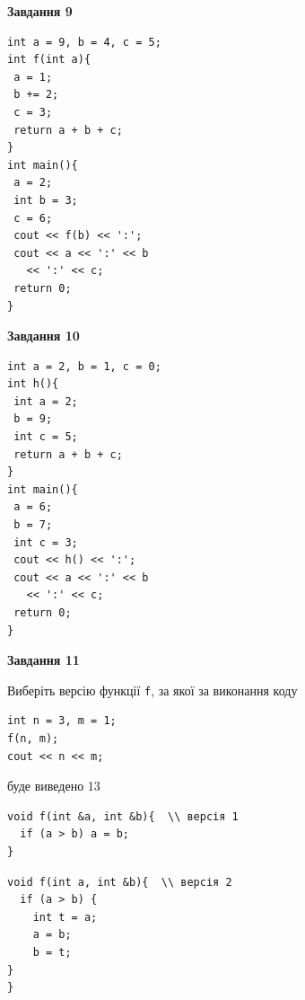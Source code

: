 \documentclass[12pt, ukrainian]{article}
\def\code#1{\Verb!#1!}
\begin{document}
{\begin {large}
\begin{minipage}[t]{11.0cm}
\end{minipage}


\begin{minipage}[t]{7.0cm}

\begin{center}
\textbf{Завдання 9}
\end{center}
\vspace{-8mm}

\begin{verbatim}
int a = 9, b = 4, c = 5;
int f(int a){
 a = 1;
 b += 2;
 c = 3;
 return a + b + c;
}
int main(){
 a = 2;
 int b = 3;
 c = 6;
 cout << f(b) << ':';
 cout << a << ':' << b 
   << ':' << c;
 return 0;
}
\end{verbatim}



\begin{center}
\textbf{Завдання 10}
\end{center}
\vspace{-8mm}

\begin{verbatim}
int a = 2, b = 1, c = 0;
int h(){
 int a = 2;
 b = 9;
 int c = 5;
 return a + b + c;
}
int main(){
 a = 6;
 b = 7;
 int c = 3;
 cout << h() << ':';
 cout << a << ':' << b 
   << ':' << c;
 return 0;
}
\end{verbatim}

\end{minipage}
\vline \hspace{1mm}
\begin{minipage}[t]{11.0cm}

\begin{center}
\textbf{Завдання 11}
\end{center}
Виберіть версію функції \code{f}, за якої за виконання коду
\begin{verbatim}
int n = 3, m = 1;
f(n, m);
cout << n << m;
\end{verbatim}

буде виведено 13

\begin{verbatim}
void f(int &a, int &b){  \\ версія 1
  if (a > b) a = b;
}
\end{verbatim}

\vspace{-8mm}\begin{verbatim}
void f(int a, int &b){  \\ версія 2
  if (a > b) {
    int t = a;
    a = b;
    b = t;
}  
}
\end{verbatim}


\end{minipage}
\end{large}}
\end{document}
